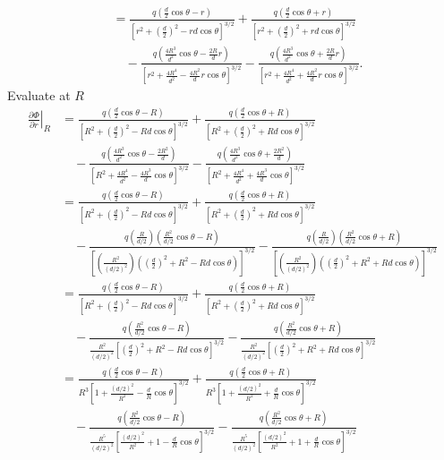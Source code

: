 \documentclass[11pt,letterpaper]{article}
\begin{document}
\begin{enumerate}
\begin{align*}
  &=\frac{q(\frac{d}{2}\cos\theta-r)}{\left[r^2+\left(\frac{d}{2}\right)^2-rd\cos\theta\right]^{3/2}}+\frac{q(\frac{d}{2}\cos\theta+r)}{\left[r^2+\left(\frac{d}{2}\right)^2+rd\cos\theta\right]^{3/2}}\\
  &\quad-\frac{q(\frac{4R^3}{d^2}\cos\theta-\frac{2R}{d}r)}{\left[r^2+\frac{4R^4}{d^2}-\frac{4R^2}{d}r\cos\theta\right]^{3/2}}-\frac{q(\frac{4R^3}{d^2}\cos\theta+\frac{2R}{d}r)}{\left[r^2+\frac{4R^4}{d^2}+\frac{4R^2}{d}r\cos\theta\right]^{3/2}}.
  \end{align*}
  Evaluate at $R$
  \begin{align*}\left.\frac{\partial\Phi}{\partial r}\right|_R  &=\frac{q(\frac{d}{2}\cos\theta-R)}{\left[R^2+\left(\frac{d}{2}\right)^2-Rd\cos\theta\right]^{3/2}}+\frac{q(\frac{d}{2}\cos\theta+R)}{\left[R^2+\left(\frac{d}{2}\right)^2+Rd\cos\theta\right]^{3/2}}\\
  &\quad-\frac{q(\frac{4R^3}{d^2}\cos\theta-\frac{2R^2}{d})}{\left[R^2+\frac{4R^4}{d^2}-\frac{4R^3}{d}\cos\theta\right]^{3/2}}-\frac{q(\frac{4R^3}{d^2}\cos\theta+\frac{2R^2}{d})}{\left[R^2+\frac{4R^4}{d^2}+\frac{4R^3}{d}\cos\theta\right]^{3/2}}\\
  &=\frac{q(\frac{d}{2}\cos\theta-R)}{\left[R^2+\left(\frac{d}{2}\right)^2-Rd\cos\theta\right]^{3/2}}+\frac{q(\frac{d}{2}\cos\theta+R)}{\left[R^2+\left(\frac{d}{2}\right)^2+Rd\cos\theta\right]^{3/2}}\\
  &\quad-\frac{q(\frac{R}{d/2})(\frac{R^2}{d/2}\cos\theta-R)}{\left[\left(\frac{R^2}{(d/2)^2}\right)\left((\frac{d}{2})^2+R^2-Rd\cos\theta\right)\right]^{3/2}}-\frac{q(\frac{R}{d/2})(\frac{R^2}{d/2}\cos\theta+R)}{\left[\left(\frac{R^2}{(d/2)^2}\right)\left((\frac{d}{2})^2+R^2+Rd\cos\theta\right)\right]^{3/2}}\\
    &=\frac{q(\frac{d}{2}\cos\theta-R)}{\left[R^2+\left(\frac{d}{2}\right)^2-Rd\cos\theta\right]^{3/2}}+\frac{q(\frac{d}{2}\cos\theta+R)}{\left[R^2+\left(\frac{d}{2}\right)^2+Rd\cos\theta\right]^{3/2}}\\
  &\quad-\frac{q(\frac{R^2}{d/2}\cos\theta-R)}{\frac{R^2}{(d/2)^2}\left[(\frac{d}{2})^2+R^2-Rd\cos\theta\right]^{3/2}}-\frac{q(\frac{R^2}{d/2}\cos\theta+R)}{\frac{R^2}{(d/2)^2}\left[(\frac{d}{2})^2+R^2+Rd\cos\theta\right]^{3/2}}\\
      &=\frac{q(\frac{d}{2}\cos\theta-R)}{R^3\left[1+\frac{(d/2)^2}{R^2}-\frac{d}{R}\cos\theta\right]^{3/2}}+\frac{q(\frac{d}{2}\cos\theta+R)}{R^3\left[1+\frac{(d/2)^2}{R^2}+\frac{d}{R}\cos\theta\right]^{3/2}}\\
  &\quad-\frac{q(\frac{R^2}{d/2}\cos\theta-R)}{\frac{R^5}{(d/2)^2}\left[\frac{(d/2)^2}{R^2}+1-\frac{d}{R}\cos\theta\right]^{3/2}}-\frac{q(\frac{R^2}{d/2}\cos\theta+R)}{\frac{R^5}{(d/2)^2}\left[\frac{(d/2)^2}{R^2}+1+\frac{d}{R}\cos\theta\right]^{3/2}}\\

\end{align*}
\end{enumerate}
\end{document}
